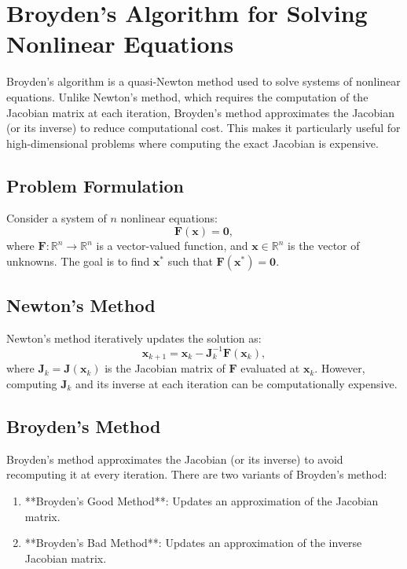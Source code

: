 \documentclass{article}
\begin{document}
\section*{Broyden’s Algorithm for Solving Nonlinear Equations}

Broyden’s algorithm is a quasi-Newton method used to solve systems of nonlinear equations. Unlike Newton’s method, which requires the computation of the Jacobian matrix at each iteration, Broyden’s method approximates the Jacobian (or its inverse) to reduce computational cost. This makes it particularly useful for high-dimensional problems where computing the exact Jacobian is expensive.

\subsection*{Problem Formulation}

Consider a system of \( n \) nonlinear equations:
\[
\mathbf{F}(\mathbf{x}) = \mathbf{0},
\]
where \( \mathbf{F}: \mathbb{R}^n \to \mathbb{R}^n \) is a vector-valued function, and \( \mathbf{x} \in \mathbb{R}^n \) is the vector of unknowns. The goal is to find \( \mathbf{x}^* \) such that \( \mathbf{F}(\mathbf{x}^*) = \mathbf{0} \).

\subsection*{Newton’s Method}

Newton’s method iteratively updates the solution as:
\[
\mathbf{x}_{k+1} = \mathbf{x}_k - \mathbf{J}_k^{-1} \mathbf{F}(\mathbf{x}_k),
\]
where \( \mathbf{J}_k = \mathbf{J}(\mathbf{x}_k) \) is the Jacobian matrix of \( \mathbf{F} \) evaluated at \( \mathbf{x}_k \). However, computing \( \mathbf{J}_k \) and its inverse at each iteration can be computationally expensive.

\subsection*{Broyden’s Method}

Broyden’s method approximates the Jacobian (or its inverse) to avoid recomputing it at every iteration. There are two variants of Broyden’s method:
\begin{enumerate}
   \item **Broyden’s Good Method**: Updates an approximation of the Jacobian matrix.
   \item **Broyden’s Bad Method**: Updates an approximation of the inverse Jacobian matrix.
\end{enumerate}
\end{document}

